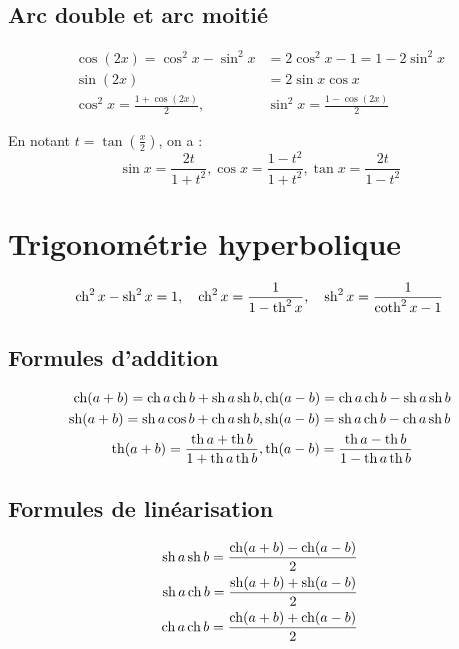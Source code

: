 \subsection{Arc double et arc moitié}

\begin{align}
  \cos(2x)=\cos^2 x - \sin^2 x &= 2\cos^2 x -1 = 1-2\sin^2 x \\
  \sin(2x)&=2\sin x \cos x \\
  \cos^2 x = \frac{1+\cos(2x)}{2}, & \sin^2 x = \frac{1-\cos(2x)}{2}
\end{align}

En notant $t = \tan \left(\frac{x}{2}\right)$, on a :
\begin{equation}
  \sin x = \frac{2t}{1+t^2}, \cos x = \frac{1-t^2}{1+t^2}, \tan x = \frac{2t}{1-t^2}
\end{equation}

\section{Trigonométrie hyperbolique}

\begin{equation}
  \operatorname{ch}^2x-\operatorname{sh}^2x = 1, \quad \operatorname{ch}^2x=\frac{1}{1-\operatorname{th}^2x}, \quad \operatorname{sh}^2x=\frac{1}{\operatorname{coth}^2x-1}
\end{equation}

\subsection{Formules d'addition}

\begin{align}
  \operatorname{ch}(a+b)=\operatorname{ch} a \operatorname{ch} b +\operatorname{sh} a \operatorname{sh} b, &   \operatorname{ch}(a-b)=\operatorname{ch} a \operatorname{ch} b -\operatorname{sh} a \operatorname{sh} b \\
  \operatorname{sh}(a+b)=\operatorname{sh} a \cos b +\operatorname{ch} a \operatorname{sh} b, &   \operatorname{sh}(a-b)=\operatorname{sh} a \operatorname{ch} b -\operatorname{ch} a \operatorname{sh} b \\
  \operatorname{th}(a+b)=\frac{\operatorname{th} a+ \operatorname{th} b}{1+\operatorname{th} a \operatorname{th} b}, &   \operatorname{th}(a-b)=\frac{\operatorname{th} a - \operatorname{th} b}{1-\operatorname{th} a \operatorname{th} b}
\end{align}

\subsection{Formules de linéarisation}

\begin{align}
  \operatorname{sh} a \operatorname{sh} b = \frac{\operatorname{ch}(a+b)-\operatorname{ch}(a-b)}{2} \\
  \operatorname{sh} a \operatorname{ch} b = \frac{\operatorname{sh}(a+b)+\operatorname{sh}(a-b)}{2} \\
  \operatorname{ch} a \operatorname{ch} b = \frac{\operatorname{ch}(a+b)+\operatorname{ch}(a-b)}{2} 
\end{align}

